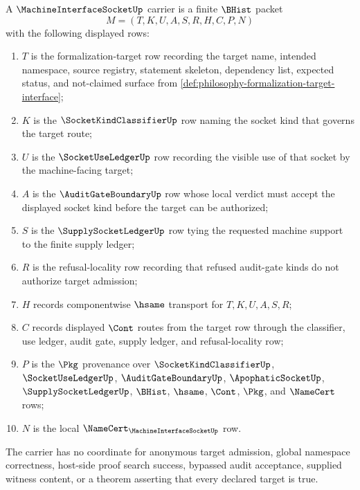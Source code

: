 \begin{definition}
\label{def:machine-interface-socket-carrier}
A $\MachineInterfaceSocketUp$ carrier is a finite $\BHist$ packet
$$
M=(T,K,U,A,S,R,H,C,P,N)
$$
with the following displayed rows:
\begin{enumerate}
\item $T$ is the formalization-target row recording the target name, intended namespace, source registry, statement skeleton, dependency list, expected status, and not-claimed surface from \autoref{def:philosophy-formalization-target-interface};
\item $K$ is the $\SocketKindClassifierUp$ row naming the socket kind that governs the target route;
\item $U$ is the $\SocketUseLedgerUp$ row recording the visible use of that socket by the machine-facing target;
\item $A$ is the $\AuditGateBoundaryUp$ row whose local verdict must accept the displayed socket kind before the target can be authorized;
\item $S$ is the $\SupplySocketLedgerUp$ row tying the requested machine support to the finite supply ledger;
\item $R$ is the refusal-locality row recording that refused audit-gate kinds do not authorize target admission;
\item $H$ records componentwise $\hsame$ transport for $T,K,U,A,S,R$;
\item $C$ records displayed $\Cont$ routes from the target row through the classifier, use ledger, audit gate, supply ledger, and refusal-locality row;
\item $P$ is the $\Pkg$ provenance over $\SocketKindClassifierUp$, $\SocketUseLedgerUp$, $\AuditGateBoundaryUp$, $\ApophaticSocketUp$, $\SupplySocketLedgerUp$, $\BHist$, $\hsame$, $\Cont$, $\Pkg$, and $\NameCert$ rows;
\item $N$ is the local $\NameCert_{\MachineInterfaceSocketUp}$ row.
\end{enumerate}
The carrier has no coordinate for anonymous target admission, global namespace correctness, host-side proof search success, bypassed audit acceptance, supplied witness content, or a theorem asserting that every declared target is true.
\end{definition}

